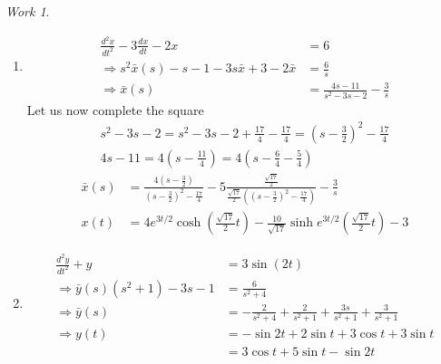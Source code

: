 \documentclass{report}
\theoremstyle{definition}
\theoremstyle{remark}
\newtheorem*{work}{Work}
\newcommand{\od}[2]{\frac{d #1}{d#2}}
\newcommand{\odt}[2]{\frac{d^2 #1}{d#2^2}}
\begin{document}
\begin{work}
\begin{enumerate}[label=(\alph*)]
\begin{equation*}
\begin{split}
                &=\frac{s+2}{(s+2)^2+1} + \frac{1}{(s+2)^2+1} - \frac{s}{s^2+1}+\frac{1}{s^2+1} \\
                \Rightarrow x(t) &= e^{-2t}(\cos t-\sin t) - \cos t+\sin t
            \end{split}
        \end{equation*}
        \item \begin{equation*}
            \begin{split}
                \odt{x}{t} -3\od{x}{t} -2x &=6\\
                \Rightarrow s^2\bar x(s)-s-1-3s\bar x+3-2\bar x&=\frac{6}{s}\\
                \Rightarrow \bar x(s)&= \frac{4s-11}{s^2-3s-2}-\frac{3}{s}
            \end{split}
        \end{equation*}
        Let us now complete the square 
        \begin{equation*}
            \begin{split}
                s^2-3s-2=s^2-3s-2+\frac{17}{4}-\frac{17}{4} =\left( s-\frac{3}{2}\right)^2-\frac{17}{4} \\
                4s-11=4\left( s-\frac{11}{4} \right) = 4\left(s-\frac{6}{4}-\frac{5}{4}\right)
            \end{split}
        \end{equation*}
        \begin{equation*}
            \begin{split}
                \bar x(s) &= \frac{4\left(s-\frac{3}{2}\right)}{\left(s-\frac{3}{2}\right)^2-\frac{17}{4}} - 5\frac{\frac{\sqrt{17}}{2}}{\frac{\sqrt{17}}{2}\left(\left(s-\frac{3}{2}\right)^2-\frac{17}{4}\right)} - \frac{3}{s}\\
                x(t)&=4e^{3t/2}\cosh\left(\frac{\sqrt{17}}{2}t\right)-\frac{10}{\sqrt{17}}\sinh e^{3t/2}\left( \frac{\sqrt{17}}{2}t \right) -3
            \end{split}
        \end{equation*}
        \item \begin{equation*}
            \begin{split}
                \odt{y}{t} + y &= 3 \sin (2t) \\
                \Rightarrow \bar y(s)(s^2+1)-3s-1&=\frac{6}{s^2+4}\\
                \Rightarrow \bar y(s) &=-\frac{2}{s^2+4}+\frac{2}{s^2+1}+\frac{3s}{s^2+1}+\frac{3}{s^2+1}\\
                \Rightarrow y(t) &=-\sin 2t+2\sin t+3\cos t+3\sin t\\
                &=3\cos t+5\sin t-\sin 2t
            \end{split}
        \end{equation*}
    \end{enumerate}
\end{work}
\end{document}

